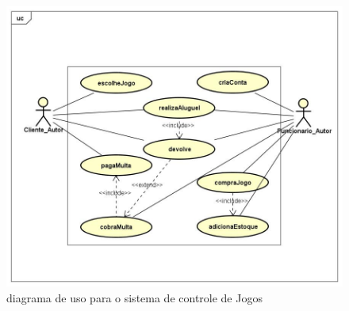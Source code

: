 \documentclass[a4paper,10pt]{article}
\begin{document}
\begin{figure}%
\center
\includegraphics[width=.7\columnwidth]{SistemaDeControleDeLocadoraDeJogos/UML/UseCaseDiagram.jpg}%
\caption{diagrama de uso para o sistema de controle de Jogos}%
\label{fig:Jogo:casoDeUso}%
\end{figure}
\end{document}
